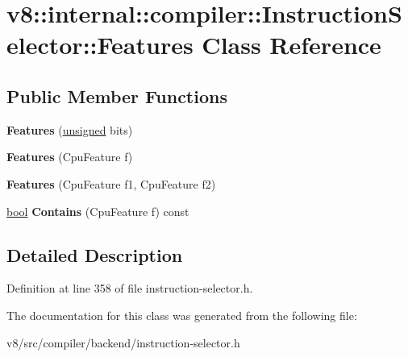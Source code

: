 \hypertarget{classv8_1_1internal_1_1compiler_1_1InstructionSelector_1_1Features}{}\section{v8\+:\+:internal\+:\+:compiler\+:\+:Instruction\+Selector\+:\+:Features Class Reference}
\label{classv8_1_1internal_1_1compiler_1_1InstructionSelector_1_1Features}
\subsection*{Public Member Functions}
\begin{DoxyCompactItemize}
\item 
\mbox{\label{classv8_1_1internal_1_1compiler_1_1InstructionSelector_1_1Features_aad9cc690435e56da584c6ba055365eca}} 
{\bfseries Features} (\mbox{\hyperlink{classunsigned}{unsigned}} bits)
\item 
\mbox{\label{classv8_1_1internal_1_1compiler_1_1InstructionSelector_1_1Features_a54ec4e5b3c11c2371b2fa0ef18246395}} 
{\bfseries Features} (Cpu\+Feature f)
\item 
\mbox{\label{classv8_1_1internal_1_1compiler_1_1InstructionSelector_1_1Features_a1052c980dbbaf5b35057288d2d4f7bc8}} 
{\bfseries Features} (Cpu\+Feature f1, Cpu\+Feature f2)
\item 
\mbox{\label{classv8_1_1internal_1_1compiler_1_1InstructionSelector_1_1Features_aa1e2a9d0afb77ef4706d78653fe0ca12}} 
\mbox{\hyperlink{classbool}{bool}} {\bfseries Contains} (Cpu\+Feature f) const
\end{DoxyCompactItemize}


\subsection{Detailed Description}


Definition at line 358 of file instruction-\/selector.\+h.



The documentation for this class was generated from the following file\+:\begin{DoxyCompactItemize}
\item 
v8/src/compiler/backend/instruction-\/selector.\+h\end{DoxyCompactItemize}
